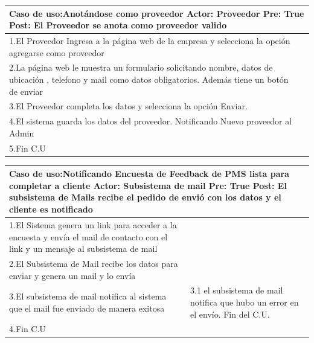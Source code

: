 \begin{longtable}{|p{}|p{}|}
    \hline
    \multicolumn{2}{|p{16cm}|}{
        \textbf{Caso de uso:}Anotándose como proveedor\newline
        \textbf{Actor:} Proveedor\newline
        \textbf{Pre: }True\newline
        \textbf{Post:}  El Proveedor se anota como proveedor valido
    }\\
    \hline
    1.El Proveedor Ingresa a la página web de la empresa y selecciona la opción agregarse como proveedor&    \\
    \hline
    2.La página web le muestra un formulario solicitando nombre, datos de ubicación , telefono y mail como datos obligatorios. Además tiene un botón de enviar& \\
    \hline
    3.El Proveedor completa los datos y selecciona la opción Enviar. &\\
    \hline
    4.El sistema guarda los datos del proveedor. Notificando Nuevo proveedor al Admin&\\
    \hline
    5.Fin C.U&\\
    \hline
\end{longtable}

\begin{longtable}{|p{}|p{}|}
    \hline
    \multicolumn{2}{|p{16cm}|}{
        \textbf{Caso de uso:}Notificando Encuesta de Feedback de PMS lista para completar a cliente\newline
        \textbf{Actor:} Subsistema de mail\newline
        \textbf{Pre: }True\newline
        \textbf{Post:}  El subsistema de Mails recibe el pedido de envió con los datos y el cliente es notificado
    }\\
    \hline
    1.El Sistema genera un link para acceder a la encuesta y envía el mail de contacto con el link y un mensaje al subsistema de mail&    \\
    \hline
    2.El Subsistema de Mail recibe los datos para enviar y genera un mail y lo envía& \\
    \hline
    3.El subsistema de mail notifica al sistema que el mail fue enviado de manera exitosa& 3.1 el subsistema de mail notifica que hubo un error en el envío. Fin del C.U.\\
    \hline
    4.Fin C.U&\\
    \hline
\end{longtable}

